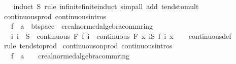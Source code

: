 \begin{isabellebody}
%
\isadelimproof
\ \ %
\endisadelimproof
%
\isatagproof
{}\isamarkupfalse%
\ {\isacharparenleft}{\kern0pt}induct\ S\ rule{\isacharcolon}{\kern0pt}\ infinite{\isacharunderscore}{\kern0pt}finite{\isacharunderscore}{\kern0pt}induct{\isacharparenright}{\kern0pt}\ {\isacharparenleft}{\kern0pt}simp{\isacharunderscore}{\kern0pt}all\ add{\isacharcolon}{\kern0pt}\ tendsto{\isacharunderscore}{\kern0pt}mult{\isacharparenright}{\kern0pt}%
\endisatagproof
{\isafoldproof}%
%
\isadelimproof
\isanewline
%
\endisadelimproof
\isanewline
{}\isamarkupfalse%
\ continuous{\isacharunderscore}{\kern0pt}prod\ {\isacharbrackleft}{\kern0pt}continuous{\isacharunderscore}{\kern0pt}intros{\isacharbrackright}{\kern0pt}{\isacharcolon}{\kern0pt}\isanewline
\ \ \ f\ {\isacharcolon}{\kern0pt}{\isacharcolon}{\kern0pt}\ {\isachardoublequoteopen}{\isacharprime}{\kern0pt}a\ {\isasymRightarrow}\ {\isacharprime}{\kern0pt}b{\isacharcolon}{\kern0pt}{\isacharcolon}{\kern0pt}t{}{\isacharunderscore}{\kern0pt}space\ {\isasymRightarrow}\ {\isacharprime}{\kern0pt}c{\isacharcolon}{\kern0pt}{\isacharcolon}{\kern0pt}{\isacharbraceleft}{\kern0pt}real{\isacharunderscore}{\kern0pt}normed{\isacharunderscore}{\kern0pt}algebra{\isacharcomma}{\kern0pt}comm{\isacharunderscore}{\kern0pt}ring{\isacharunderscore}{\kern0pt}{}{\isacharbraceright}{\kern0pt}{\isachardoublequoteclose}\isanewline
\ \ \ {\isachardoublequoteopen}{\isacharparenleft}{\kern0pt}{\isasymAnd}i{\isachardot}{\kern0pt}\ i\ {\isasymin}\ S\ {\isasymLongrightarrow}\ continuous\ F\ {\isacharparenleft}{\kern0pt}f\ i{\isacharparenright}{\kern0pt}{\isacharparenright}{\kern0pt}\ {\isasymLongrightarrow}\ continuous\ F\ {\isacharparenleft}{\kern0pt}{\isasymlambda}x{\isachardot}{\kern0pt}\ {\isasymProd}i{\isasymin}S{\isachardot}{\kern0pt}\ f\ i\ x{\isacharparenright}{\kern0pt}{\isachardoublequoteclose}\isanewline
%
\isadelimproof
\ \ %
\endisadelimproof
%
\isatagproof
{}\isamarkupfalse%
\ continuous{\isacharunderscore}{\kern0pt}def\ \isamarkupfalse%
\ {\isacharparenleft}{\kern0pt}rule\ tendsto{\isacharunderscore}{\kern0pt}prod{\isacharparenright}{\kern0pt}%
\endisatagproof
{\isafoldproof}%
%
\isadelimproof
\isanewline
%
\endisadelimproof
\isanewline
{}\isamarkupfalse%
\ continuous{\isacharunderscore}{\kern0pt}on{\isacharunderscore}{\kern0pt}prod\ {\isacharbrackleft}{\kern0pt}continuous{\isacharunderscore}{\kern0pt}intros{\isacharbrackright}{\kern0pt}{\isacharcolon}{\kern0pt}\isanewline
\ \ \ f\ {\isacharcolon}{\kern0pt}{\isacharcolon}{\kern0pt}\ {\isachardoublequoteopen}{\isacharprime}{\kern0pt}a\ {\isasymRightarrow}\ {\isacharunderscore}{\kern0pt}\ {\isasymRightarrow}\ {\isacharprime}{\kern0pt}c{\isacharcolon}{\kern0pt}{\isacharcolon}{\kern0pt}{\isacharbraceleft}{\kern0pt}real{\isacharunderscore}{\kern0pt}normed{\isacharunderscore}{\kern0pt}algebra{\isacharcomma}{\kern0pt}comm{\isacharunderscore}{\kern0pt}ring{\isacharunderscore}{\kern0pt}{}{\isacharbraceright}{\kern0pt}{\isachardoublequoteclose}\isanewline

\end{isabellebody}
